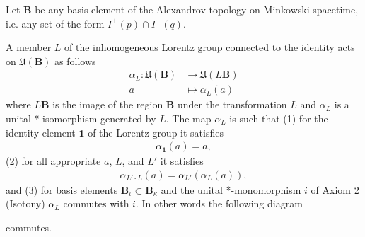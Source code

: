 \begin{definition}
    \label{def:lorentz-covariance}
    \leanok
    Let $\mathbf{B}$ be any basis element of the Alexandrov topology on Minkowski spacetime, i.e. any set of the form $I^+(p) \cap I^-(q)$.

    A member $L$ of the inhomogeneous Lorentz group connected to the identity acts on $\mathfrak{U}(\mathbf{B})$ as follows
    \begin{align}
        \alpha_L : \mathfrak{U}(\mathbf{B}) &\longrightarrow \mathfrak{U}(L\mathbf{B}) \\
                             a              &\longmapsto     \alpha_L(a)
    \end{align}
    where $L\mathbf{B}$ is the image of the region $\mathbf{B}$ under the transformation $L$ and $\alpha_L$ is a unital *-isomorphism generated by $L$. The map $\alpha_L$ is such that (1) for the identity element $\mathbf{1}$ of the Lorentz group it satisfies
    \begin{align}
        \alpha_{\mathbf{1}}(a) = a,
    \end{align}
    (2) for all appropriate $a$, $L$, and $L'$ it satisfies
    \begin{align}
        \alpha_{L' \cdot L}(a) = \alpha_{L'}(\alpha_{L}(a)),
    \end{align}
    and (3) for basis elements $\mathbf{B}_\iota \subset \mathbf{B}_\kappa$ and the unital *-monomorphism $i$ of Axiom 2 (Isotony) $\alpha_L$ commutes with $i$. In other words the following diagram

    \begin{center}
    \end{center}

    commutes.
\end{definition}


